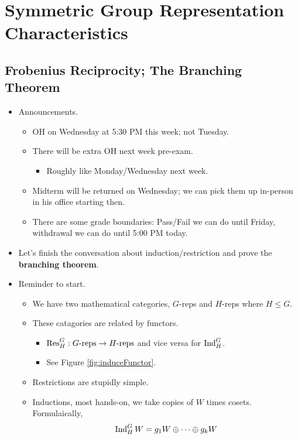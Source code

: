 \documentclass[../notes.tex]{subfiles}
\begin{document}
\chapter{Symmetric Group Representation Characteristics}
\section{Frobenius Reciprocity; The Branching Theorem}
\begin{itemize}
    \item {}Announcements.
    \begin{itemize}
        \item OH on Wednesday at 5:30 PM this week; not Tuesday.
        \item There will be extra OH next week pre-exam.
        \begin{itemize}
            \item Roughly like Monday/Wednesday next week.
        \end{itemize}
        \item Midterm will be returned on Wednesday; we can pick them up in-person in his office starting then.
        \item There are some grade boundaries: Pass/Fail we can do until Friday, withdrawal we can do until 5:00 PM today.
    \end{itemize}
    \item Let's finish the conversation about induction/restriction and prove the \textbf{branching theorem}.
    \item Reminder to start.
    \begin{itemize}
        \item We have two mathematical categories, $G$-reps and $H$-reps where $H\leq G$.
        \item These catagories are related by functors.
        \begin{itemize}
            \item $\operatorname{Res}_H^G:G\text{-reps}\to H\text{-reps}$ and vice versa for $\operatorname{Ind}_H^G$.
            \item See Figure \ref{fig:induceFunctor}.
        \end{itemize}
        \item Restrictions are stupidly simple.
        \item Inductions, most hands-on, we take copies of $W$ times cosets. Formulaically,
        \begin{equation*}
            \ind_H^GW = g_1W\oplus\cdots\oplus g_kW

\end{equation*}
\end{itemize}
\end{itemize}
\end{document}
